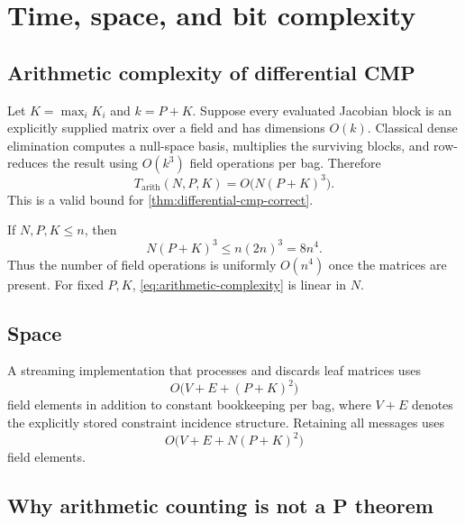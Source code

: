 \section{Time, space, and bit complexity}
\label{sec:complexity}

\subsection{Arithmetic complexity of differential CMP}

Let \(K=\max_iK_i\) and \(k=P+K\).  Suppose every evaluated Jacobian block is
an explicitly supplied matrix over a field and has dimensions \(O(k)\).
Classical dense elimination computes a null-space basis, multiplies the
surviving blocks, and row-reduces the result using \(O(k^3)\) field operations
per bag.  Therefore
\begin{equation}
  T_{\mathrm{arith}}(N,P,K)=O\bigl(N(P+K)^3\bigr).
  \label{eq:arithmetic-complexity}
\end{equation}
This is a valid bound for \cref{thm:differential-cmp-correct}.

If \(N,P,K\le n\), then
\begin{equation}
  N(P+K)^3
  \le n(2n)^3
  =8n^4.
  \label{eq:uniform-arithmetic-inequality}
\end{equation}
Thus the number of field operations is uniformly \(O(n^4)\) once the matrices
are present.  For fixed \(P,K\), \cref{eq:arithmetic-complexity} is linear in
\(N\).

\subsection{Space}

A streaming implementation that processes and discards leaf matrices uses
\begin{equation}
  O\bigl(V+E+(P+K)^2\bigr)
  \label{eq:streaming-space}
\end{equation}
field elements in addition to constant bookkeeping per bag, where \(V+E\)
denotes the explicitly stored constraint incidence structure.  Retaining all
messages uses
\begin{equation}
  O\bigl(V+E+N(P+K)^2\bigr)
\end{equation}
field elements.

\subsection{Why arithmetic counting is not a P theorem}

